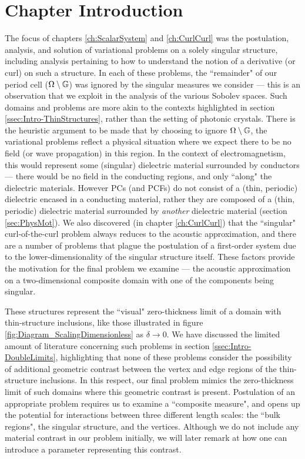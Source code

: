 \section{Chapter Introduction} \label{sec:SingIncChapterIntro}
The focus of chapters \ref{ch:ScalarSystem} and \ref{ch:CurlCurl} was the postulation, analysis, and solution of variational problems on a solely singular structure, including analysis pertaining to how to understand the notion of a derivative (or curl) on such a structure.
In each of these problems, the ``remainder" of our period cell ($\Omega\setminus\mathbb{G}$) was ignored by the singular measures we consider --- this is an observation that we exploit in the analysis of the various Sobolev spaces.
Such domains and problems are more akin to the contexts highlighted in section \ref{ssec:Intro-ThinStructures}, rather than the setting of photonic crystals.
There is the heuristic argument to be made that by choosing to ignore $\Omega\setminus\mathbb{G}$, the variational problems reflect a physical situation where we expect there to be no field (or wave propagation) in this region.
In the context of electromagnetism, this would represent some (singular) dielectric material surrounded by conductors --- there would be no field in the conducting regions, and only ``along" the dielectric materials.
However PCs (and PCFs) do not consist of a (thin, periodic) dielectric encased in a conducting material, rather they are composed of a (thin, periodic) dielectric material surrounded by \emph{another} dielectric material (section \ref{sec:PhysMot}).
We also discovered (in chapter \ref{ch:CurlCurl}) that the ``singular" curl-of-the-curl problem always reduces to the acoustic approximation, and there are a number of problems that plague the postulation of a first-order system due to the lower-dimensionality of the singular structure itself.
These factors provide the motivation for the final problem we examine --- the acoustic approximation on a two-dimensional composite domain with one of the components being singular.

These structures represent the ``visual" zero-thickness limit of a domain with thin-structure inclusions, like those illustrated in figure \ref{fig:Diagram_ScalingDimensionless} as $\delta\rightarrow0$.
We have discussed the limited amount of literature concerning such problems in section \ref{ssec:Intro-DoubleLimits}, highlighting that none of these problems consider the possibility of additional geometric contrast between the vertex and edge regions of the thin-structure inclusions.
In this respect, our final problem mimics the zero-thickness limit of such domains where this geometric contrast is present.
Postulation of an appropriate problem requires us to examine a ``composite measure", and opens up the potential for interactions between three different length scales: the ``bulk regions", the singular structure, and the vertices.
Although we do not include any material contrast in our problem initially, we will later remark at how one can introduce a parameter representing this contrast.


